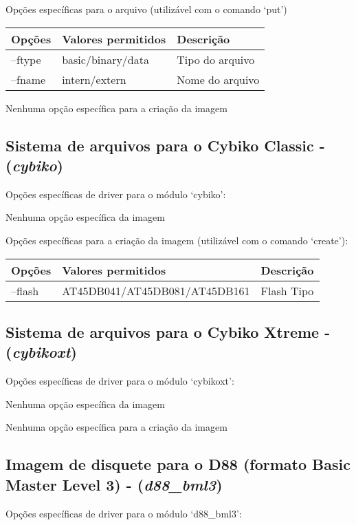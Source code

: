 \documentclass[letterpaper,10pt,brazil]{sphinxmanual}
\begin{document}
Opções específicas para o arquivo (utilizável com o comando `put')

\noindent\begin{tabulary}{\linewidth}{|L|L|L|}
\hline

Opções
&
Valores permitidos
&
Descrição
\\
\hline
--ftype
&
basic/binary/data
&
Tipo do arquivo
\\
\hline
--fname
&
intern/extern
&
Nome do arquivo
\\
\hline\end{tabulary}


Nenhuma opção específica para a criação da imagem


\subsection{Sistema de arquivos para o Cybiko Classic - (\emph{cybiko})}
\label{tools/imgtool:sistema-de-arquivos-para-o-cybiko-classic-cybiko}
Opções específicas de driver para o módulo `cybiko':

Nenhuma opção específica da imagem

Opções específicas para a criação da imagem (utilizável com o comando `create'):

\noindent\begin{tabulary}{\linewidth}{|L|L|L|}
\hline

Opções
&
Valores permitidos
&
Descrição
\\
\hline
--flash
&
AT45DB041/AT45DB081/AT45DB161
&
Flash Tipo
\\
\hline\end{tabulary}



\subsection{Sistema de arquivos para o Cybiko Xtreme - (\emph{cybikoxt})}
\label{tools/imgtool:sistema-de-arquivos-para-o-cybiko-xtreme-cybikoxt}
Opções específicas de driver para o módulo `cybikoxt':

Nenhuma opção específica da imagem

Nenhuma opção específica para a criação da imagem


\subsection{Imagem de disquete para o D88 (formato Basic Master Level 3) - (\emph{d88\_bml3})}
\label{tools/imgtool:imagem-de-disquete-para-o-d88-formato-basic-master-level-3-d88-bml3}
Opções específicas de driver para o módulo `d88\_bml3':
\end{document}
